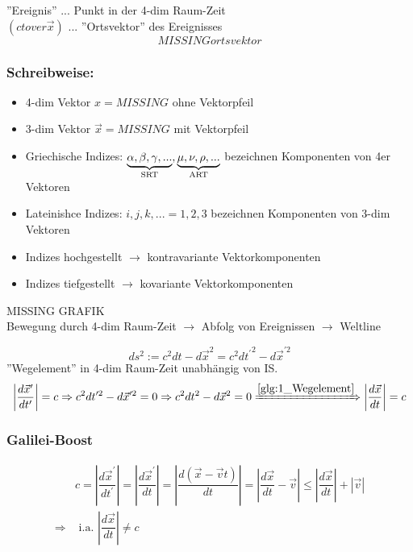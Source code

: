 \documentclass[a4paper, 11pt]{article}
\numberwithin{equation}{section}
\begin{document}
''Ereignis'' ... Punkt in der 4-dim Raum-Zeit\\
$\left(ct over \vec{x}\right) $ ... ''Ortsvektor'' des Ereignisses
\begin{equation}
MISSING ortsvektor
\end{equation} 
 
\subsubsection*{Schreibweise:}
\begin{itemize}
\item 4-dim Vektor $x = MISSING$ ohne Vektorpfeil
\item 3-dim Vektor $\vec{x} = MISSING$ mit Vektorpfeil
\item Griechische Indizes: $\underbrace{\alpha, \beta, \gamma, ...}_{\mathclap{\text{SRT}}} , \underbrace{\mu, \nu, \rho, ...}_{\mathclap{\text{ART}}}$ bezeichnen Komponenten von 4er Vektoren 
\item Lateinishce Indizes: $i,j,k,... = 1,2,3$ bezeichnen Komponenten von 3-dim Vektoren
\item Indizes hochgestellt $\rightarrow$ kontravariante Vektorkomponenten
\item Indizes tiefgestellt $\rightarrow$ kovariante Vektorkomponenten
\end{itemize}


MISSING GRAFIK\\
Bewegung durch 4-dim Raum-Zeit $\rightarrow$ Abfolg von Ereignissen $\rightarrow$ Weltline


\begin{equation}
\label{glg:1_Wegelement}
ds^2 := c^2dt - d\vec{x}^2 = c^2d{t^\prime}^2 - d{\vec{x}^{\prime 2}}
\end{equation}
''Wegelement'' in 4-dim Raum-Zeit unabhängig von IS.
\begin{equation}
\left| \dfrac{d\vec{x}^\prime}{dt^\prime} \right| = c \Rightarrow c^2dt^{\prime 2}-d\vec{x}^{\prime 2} = 0 \Rightarrow c^2dt^2 - d\vec{x}^2 = 0 \xRightarrow{\ref{glg:1_Wegelement}} \left|\dfrac{d\vec{x}}{dt} \right| = c
\end{equation}

\subsubsection*{Galilei-Boost}

\begin{equation}
\begin{aligned}
&c =\left| \dfrac{d\vec{x}^\prime}{dt^\prime}\right| = \left| \dfrac{d\vec{x}^\prime}{dt}\right| = \left| \dfrac{d(\vec{x}-\vec{v}t)}{dt}\right| = \left| \dfrac{d\vec{x}}{dt} - \vec{v}\right| \leq \left| \dfrac{d\vec{x}}{dt}\right| + \left| \vec{v} \right| \\
\Rightarrow &\text{ i.a. } \left| \dfrac{d\vec{x}}{dt}\right| \neq c
\end{aligned}
\end{equation}
\end{document}
